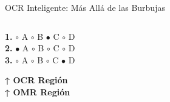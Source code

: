 \documentclass[aspectratio=169,11pt]{beamer}
\begin{document}
\begin{frame}{OCR Inteligente: Más Allá de las Burbujas}
\begin{columns}
\begin{column}{0.4\textwidth}
\begin{center}
{\begin{minipage}{0.9\textwidth}
                    \textbf{1.} $\circ$ A $\circ$ B $\bullet$ C $\circ$ D\\
                    \textbf{2.} $\bullet$ A $\circ$ B $\circ$ C $\circ$ D\\
                    \textbf{3.} $\circ$ A $\circ$ B $\circ$ C $\bullet$ D\\
                    \vspace{0.2cm}
                    
                    \textcolor{jazzred}{\textbf{↑ OCR Región}}\\
                    \textcolor{jazzblue}{\textbf{↑ OMR Región}}
                \end{minipage}}
            \end{center}
        \end{column}
    \end{columns}
\end{frame}
\end{document}
